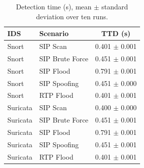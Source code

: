 \begin{table}[t]
\centering
\caption{Detection time (s), mean $\pm$ standard deviation over ten runs.}
\label{tab:ttd}
\begin{tabular}{llc}
\hline
IDS & Scenario & TTD (s) \\
\hline
Snort & SIP Scan & 0.401 $\pm$ 0.001 \\
Snort & SIP Brute Force & 0.451 $\pm$ 0.001 \\
Snort & SIP Flood & 0.791 $\pm$ 0.001 \\
Snort & SIP Spoofing & 0.451 $\pm$ 0.000 \\
Snort & RTP Flood & 0.401 $\pm$ 0.001 \\
\hline
Suricata & SIP Scan & 0.400 $\pm$ 0.000 \\
Suricata & SIP Brute Force & 0.451 $\pm$ 0.001 \\
Suricata & SIP Flood & 0.791 $\pm$ 0.001 \\
Suricata & SIP Spoofing & 0.451 $\pm$ 0.001 \\
Suricata & RTP Flood & 0.401 $\pm$ 0.001 \\
\hline
\end{tabular}
\end{table}
